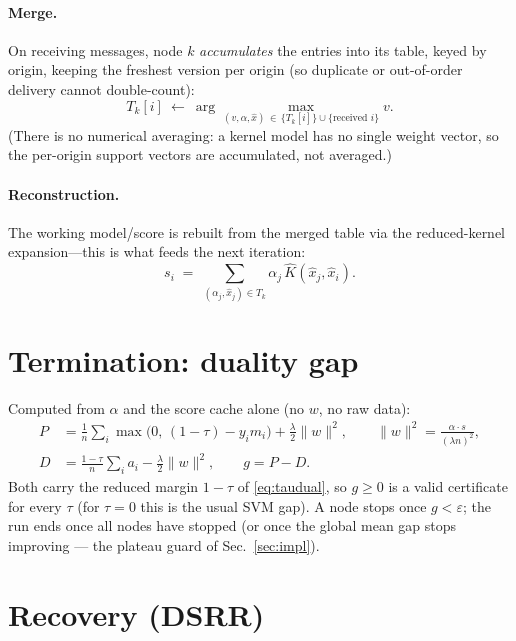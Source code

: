 \documentclass[11pt]{article}
\begin{document}
\paragraph{Merge.} On receiving messages, node $k$ \emph{accumulates} the entries
into its table, keyed by origin, keeping the freshest version per origin (so
duplicate or out-of-order delivery cannot double-count):
\begin{equation}\label{eq:merge}
  T_k[i]\ \leftarrow\ \arg\max_{(v,\alpha,\hat x)\,\in\,\{T_k[i]\}\cup\{\text{received }i\}} v .
\end{equation}
(There is no numerical averaging: a kernel model has no single weight vector, so
the per-origin support vectors are accumulated, not averaged.)

\paragraph{Reconstruction.} The working model/score is rebuilt from the merged
table via the reduced-kernel expansion---this is what feeds the next iteration:
\begin{equation}\label{eq:recon}
  s_i \;=\; \sum_{(\alpha_j,\hat x_j)\in T_k}\alpha_j\,\hat K(\hat x_j,\hat x_i).
\end{equation}

\section{Termination: duality gap}

Computed from $\alpha$ and the score cache alone (no $w$, no raw data):
\begin{align}
  P &= \frac1n\sum_i\max\!\big(0,\,(1-\tau)-y_i m_i\big)+\frac{\lambda}{2}\|w\|^{2},
  \qquad
  \|w\|^{2}=\frac{\alpha\cdot s}{(\lambda n)^{2}}, \label{eq:primal}\\
  D &= \frac{1-\tau}{n}\sum_i a_i-\frac{\lambda}{2}\|w\|^{2},
  \qquad
  g = P-D. \label{eq:gap}
\end{align}
Both carry the reduced margin $1-\tau$ of \eqref{eq:taudual}, so $g\ge0$ is a valid
certificate for every $\tau$ (for $\tau=0$ this is the usual SVM gap).
A node stops once $g<\varepsilon$; the run ends once all nodes have stopped (or once
the global mean gap stops improving --- the plateau guard of Sec.~\ref{sec:impl}).

\section{Recovery (DSRR)}\label{sec:recovery}
\end{document}
